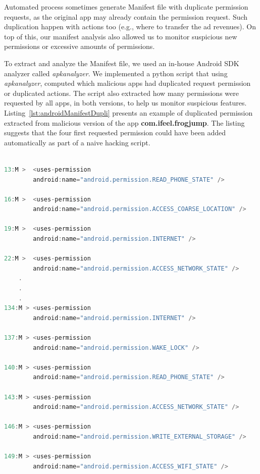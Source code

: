 Automated process sometimes generate Manifest file with duplicate permission requests, as the original app may already contain the permission request. Such duplication happen with actions too (e.g., where to transfer the ad revenues). On top of this, our manifest analysis also allowed us to monitor suspicious new permissions or excessive amounts of permissions. 

To extract and analyze the Manifest file, we used an in-house Android SDK analyzer called \textit{apkanalyzer}. We implemented a python script that using \textit{apkanalyzer}, computed which malicious apps had duplicated request permission or duplicated actions. The script also extracted how many permissions were requested by all apps, in both versions, to help us monitor suspicious features. Listing~\ref{lst:androidManifestDupli} presents an example of duplicated permission extracted from malicious version of the app \textbf{com.ifeel.frogjump}. The listing suggests that the four first requested permission could have been added automatically as part of a naive hacking script.

\begin{lstlisting}[caption={Example of duplicated permission from malicious version of app com.ifeel.frogjump}, language=Java,
    basicstyle=\fontsize{6}{5}\selectfont\ttfamily,
    label={lst:androidManifestDupli}]

13:M >  <uses-permission
        android:name="android.permission.READ_PHONE_STATE" />

16:M >  <uses-permission
        android:name="android.permission.ACCESS_COARSE_LOCATION" />

19:M >  <uses-permission
        android:name="android.permission.INTERNET" />

22:M >  <uses-permission
        android:name="android.permission.ACCESS_NETWORK_STATE" />
    .
    .
    .
134:M > <uses-permission
        android:name="android.permission.INTERNET" />

137:M > <uses-permission
        android:name="android.permission.WAKE_LOCK" />

140:M > <uses-permission
        android:name="android.permission.READ_PHONE_STATE" />

143:M > <uses-permission
        android:name="android.permission.ACCESS_NETWORK_STATE" />

146:M > <uses-permission
        android:name="android.permission.WRITE_EXTERNAL_STORAGE" />

149:M > <uses-permission
        android:name="android.permission.ACCESS_WIFI_STATE" />
\end{lstlisting}